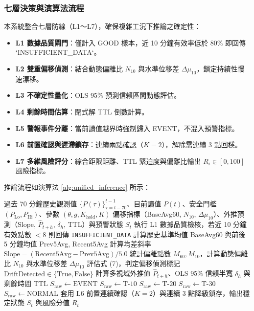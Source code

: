 \documentclass[fontset=none, a4paper, 12pt]{ctexart}
\begin{document}
\subsubsection{七層決策與演算法流程}
本系統整合七層防線（L1～L7），確保複雜工況下推論之確定性：
\begin{itemize}
    \item \textbf{L1 數據品質閘門}：僅計入 GOOD 樣本，近 10 分鐘有效率低於 80\% 即回傳 `INSUFFICIENT\_DATA`。
    \item \textbf{L2 雙重偏移偵測}：結合動態偏離比 $N_{10}$ 與水準位移差 $\Delta\mu_{10}$，鎖定持續性慢速漂移。
    \item \textbf{L3 不確定性量化}：OLS 95\% 預測信賴區間動態評估。
    \item \textbf{L4 剩餘時間估算}：閉式解 TTL 倒數計算。
    \item \textbf{L5 警報事件分離}：當前讀值越界時強制歸入 EVENT，不混入預警指標。
    \item \textbf{L6 前置確認與遲滯鎖存}：連續兩點確認（$K=2$），解除需連續 3 點回穩。
    \item \textbf{L7 多維風險評分}：綜合距限距離、TTL 緊迫度與偏離比輸出 $R_i \in [0, 100]$ 風險指標。
\end{itemize}

推論流程如演算法 \ref{alg:unified_inference} 所示：
\begin{algorithm}[H]
\caption{PCW 因果式雙滑動視窗漂移預測與多層狀態機聯合推論演算法}
\label{alg:unified_inference}
\begin{algorithmic}[1]
\Require 過去 70 分鐘歷史觀測值 $\{P(\tau)\}_{\tau=t-70}^{t-1}$、目前讀值 $P(t)$、安全門檻 $(P_{\text{Lo}}, P_{\text{Hi}})$、參數 $(\theta, g, K_{\text{hold}}, K)$
\Ensure 偏移指標（BaseAvg60, $N_{10}$, $\Delta\mu_{10}$）、外推預測（Slope, $\hat{P}_{t+h}$, $\delta_h$, TTL）與預警狀態 $S_t$
\State 執行 L1 數據品質檢核，若近 10 分鐘有效點數 $< 8$ 則回傳 \texttt{INSUFFICIENT\_DATA}
\State 計算歷史基準均值 BaseAvg60 與前後 5 分鐘均值 Prev5Avg, Recent5Avg
\State 計算均差斜率 $\text{Slope} = (\text{Recent5Avg} - \text{Prev5Avg}) / 5.0$
\State 統計偏離點數 $M_{60}, M_{10}$，計算動態偏離比 $N_{10}$ 與水準位移差 $\Delta\mu_{10}$
\State 評估式 (7)，判定偏移偵測標記 $\text{DriftDetected} \in \{\text{True}, \text{False}\}$
\State 計算多視域外推值 $\hat{P}_{t+h}$、OLS 95\% 信賴半寬 $\delta_h$ 與剩餘時間 TTL
    \State $S_{\text{raw}} \gets \text{EVENT}$ 
    \State $S_{\text{raw}} \gets \text{T-10}$
    \State $S_{\text{raw}} \gets \text{T-20}$
    \State $S_{\text{raw}} \gets \text{T-30}$
\Else
    \State $S_{\text{raw}} \gets \text{NORMAL}$
\EndIf
\State 套用 L6 前置連續確認（$K=2$）與連續 3 點降級鎖存，輸出穩定狀態 $S_t$ 與風險分值 $R_t$
\end{algorithmic}
\end{algorithm}
\end{document}
